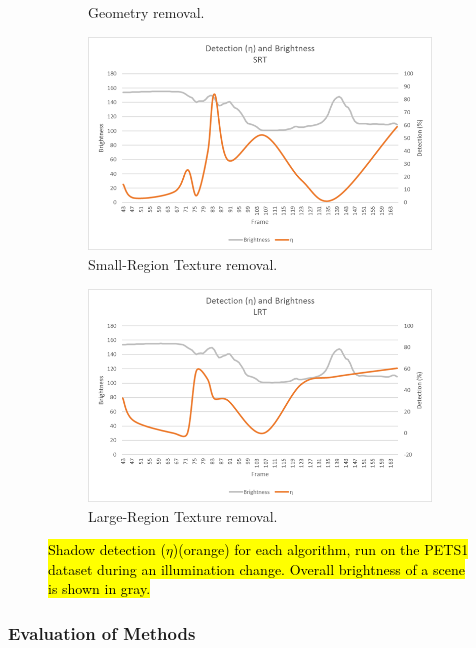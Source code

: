 \begin{figure}
\begin{subfigure}{.32\linewidth}
  \caption{Geometry removal.}
\end{subfigure}
\hfill
\begin{subfigure}{.32\linewidth}
  \includegraphics[width=1\linewidth]{figures/selectinganalgorithm_srt.jpg}
  \caption{Small-Region Texture removal.}
\end{subfigure}
\begin{subfigure}{.32\linewidth}
  \includegraphics[width=1\linewidth]{figures/selectinganalgorithm_lrt.jpg}
  \caption{Large-Region Texture removal.}
\end{subfigure}

\caption{\hl{Shadow detection ($\eta$)(orange) for each algorithm, run on the PETS1 dataset during an illumination change. Overall brightness of a scene is shown in gray.}}
\label{fig:selectinganalgorithm}
\end{figure}

\subsubsection{Evaluation of Methods}

